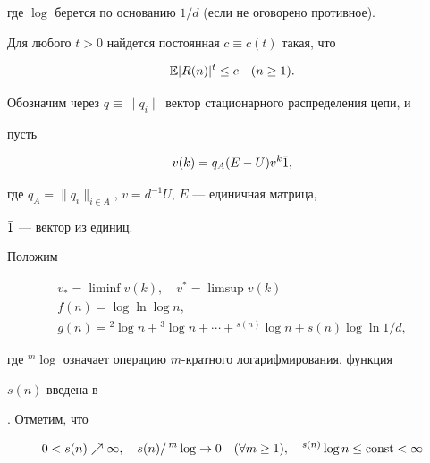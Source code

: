 где $\log$ берется по основанию $1/d$ (если не оговорено противное). 


 


\begin{thm} Для любого $t>0$ найдется постоянная $c\equiv c(t)$ такая, что 


\begin{equation} 


\Bbb E|R(n)|^t\le c\quad (n\ge 1). 


\end{equation} 


\end{thm} 


 


Обозначим через $q\equiv\|q_i\|$ вектор стационарного распределения цепи, и 


пусть 


$$ 


v(k)=q_A(E-U)v^k\Bar 1, 


$$ 


где $q_A=\|q_i\|_{i\in A}$, $v=d^{-1}U$, $E$ --- единичная матрица, 


$\Bar 1$ --- вектор из единиц. 


 


Положим 


\begin{gather*} 


v_*=\liminf v(k),\quad v^*=\limsup v(k)\\ 


f(n)=\log\ln\log n,\\ 


g(n)= {}^2\log n+{}^3\log n+\dotsb+{}^{s(n)}\log n+s(n)\log \ln 1/d, 


\end{gather*} 


где ${}^m\log$ означает операцию $m$-кратного логарифмирования, функция 


$s(n)$ введена в 


\cite{Nov2}. Отметим, что 


$$ 


0<s(n)\nearrow\infty,\quad s(n)/\,{}^m\log\to 0\quad (\forall m\ge 1), 


\quad {}^{s(n)}\log n\le\const<\infty 


$$ 


 


